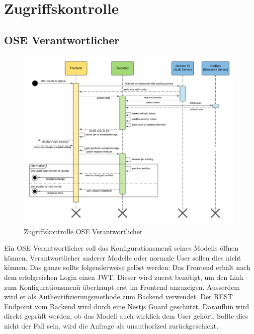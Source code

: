 \section{Zugriffskontrolle}
\subsection{OSE Verantwortlicher}
\begin{figure}[H]
  \centering
  \includegraphics[width=.95\linewidth]{./images/zugriffskontrolle.png}
  \caption[{Sequenzdiagram, welches die Zugriffskontrolle für den OSE Verantwortlichen beschreibt}]{Zugriffskontrolle OSE Verantwortlicher}
  \label{fig:zugriffskontrolle}
\end{figure}
Ein OSE Verantwortlicher soll das Konfigurationsmenü seines Modells öffnen können. Verantwortlicher anderer Modelle oder normale User sollen dies nicht können.
Das ganze sollte folgenderweise gelöst werden:
\newline
Das Frontend erhält nach dem erfolgreichen Login einen JWT. Dieser wird zuerst benötigt, um den Link zum Konfigurationsmenü überhaupt erst im Frontend anzuzeigen. Ausserdem wird er als Authentifizierungsmethode zum Backend verwendet. Der REST Endpoint vom Backend wird durch eine Nestjs Guard\cite{nest_guards} geschützt. Daraufhin wird direkt geprüft werden, ob das Modell auch wirklich dem User gehört. Sollte dies nicht der Fall sein, wird die Anfrage als unauthorized zurückgeschickt.
